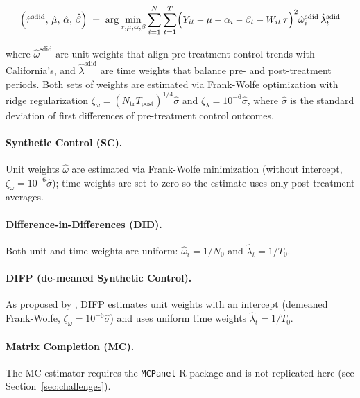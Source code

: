\documentclass[12pt]{article}
\begin{document}
\begin{equation}
\left(\hat{\tau}^{\text{sdid}},\, \hat{\mu},\, \hat{\alpha},\, \hat{\beta}\right)
\;=\;
\arg\min_{\tau,\mu,\alpha,\beta}
\sum_{i=1}^{N}\sum_{t=1}^{T}
\Bigl(Y_{it} - \mu - \alpha_i - \beta_t - W_{it}\,\tau\Bigr)^2
\hat{\omega}^{\text{sdid}}_i\,\hat{\lambda}^{\text{sdid}}_t
\label{eq:sdid}
\end{equation}

\noindent where $\hat{\omega}^{\text{sdid}}$ are unit weights that align
pre-treatment control trends with California's, and $\hat{\lambda}^{\text{sdid}}$
are time weights that balance pre- and post-treatment periods.
Both sets of weights are estimated via Frank-Wolfe optimization with
ridge regularization $\zeta_\omega = (N_{\text{tr}} T_{\text{post}})^{1/4} \hat{\sigma}$
and $\zeta_\lambda = 10^{-6} \hat{\sigma}$, where $\hat{\sigma}$ is the standard
deviation of first differences of pre-treatment control outcomes.

\paragraph{Synthetic Control (SC).}
Unit weights $\hat{\omega}$ are estimated via Frank-Wolfe minimization
(without intercept, $\zeta_\omega = 10^{-6}\hat{\sigma}$);
time weights are set to zero so the estimate uses only post-treatment averages.

\paragraph{Difference-in-Differences (DID).}
Both unit and time weights are uniform: $\hat{\omega}_i = 1/N_0$ and
$\hat{\lambda}_t = 1/T_0$.

\paragraph{DIFP (de-meaned Synthetic Control).}
As proposed by \citet{doudchenko2016balancing}, DIFP estimates unit weights
with an intercept (demeaned Frank-Wolfe, $\zeta_\omega = 10^{-6}\hat{\sigma}$)
and uses uniform time weights $\hat{\lambda}_t = 1/T_0$.

\paragraph{Matrix Completion (MC).}
The MC estimator requires the \texttt{MCPanel} R package and is not replicated here
(see Section~\ref{sec:challenges}).
\end{document}
